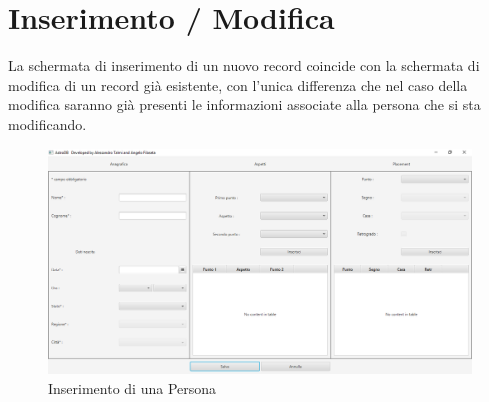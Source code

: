 \section{Inserimento / Modifica}
La schermata di inserimento di un nuovo record coincide con la schermata di modifica di un record già esistente, con l’unica differenza che nel caso della modifica saranno già presenti le informazioni associate alla persona che si sta modificando.
\begin{figure}[H]
\centering
\includegraphics[width=\textwidth, height=0.35\textheight, keepaspectratio]{img/c5/InsertPerson.png}
\caption{Inserimento di una Persona}
\label{fig:inspers}
\end{figure}

